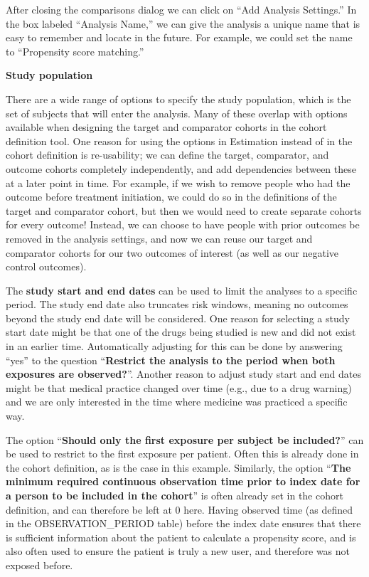 \documentclass[]{book}
\begin{document}
After closing the comparisons dialog we can click on ``Add Analysis Settings.'' In the box labeled ``Analysis Name,'' we can give the analysis a unique name that is easy to remember and locate in the future. For example, we could set the name to ``Propensity score matching.''

\textbf{Study population}

There are a wide range of options to specify the study population, which is the set of subjects that will enter the analysis. Many of these overlap with options available when designing the target and comparator cohorts in the cohort definition tool. One reason for using the options in Estimation instead of in the cohort definition is re-usability; we can define the target, comparator, and outcome cohorts completely independently, and add dependencies between these at a later point in time. For example, if we wish to remove people who had the outcome before treatment initiation, we could do so in the definitions of the target and comparator cohort, but then we would need to create separate cohorts for every outcome! Instead, we can choose to have people with prior outcomes be removed in the analysis settings, and now we can reuse our target and comparator cohorts for our two outcomes of interest (as well as our negative control outcomes).

The \textbf{study start and end dates} can be used to limit the analyses to a specific period. The study end date also truncates risk windows, meaning no outcomes beyond the study end date will be considered. One reason for selecting a study start date might be that one of the drugs being studied is new and did not exist in an earlier time. Automatically adjusting for this can be done by answering ``yes'' to the question ``\textbf{Restrict the analysis to the period when both exposures are observed?}''. Another reason to adjust study start and end dates might be that medical practice changed over time (e.g., due to a drug warning) and we are only interested in the time where medicine was practiced a specific way.

The option ``\textbf{Should only the first exposure per subject be included?}'' can be used to restrict to the first exposure per patient. Often this is already done in the cohort definition, as is the case in this example. Similarly, the option ``\textbf{The minimum required continuous observation time prior to index date for a person to be included in the cohort}'' is often already set in the cohort definition, and can therefore be left at 0 here. Having observed time (as defined in the OBSERVATION\_PERIOD table) before the index date ensures that there is sufficient information about the patient to calculate a propensity score, and is also often used to ensure the patient is truly a new user, and therefore was not exposed before.
\end{document}
